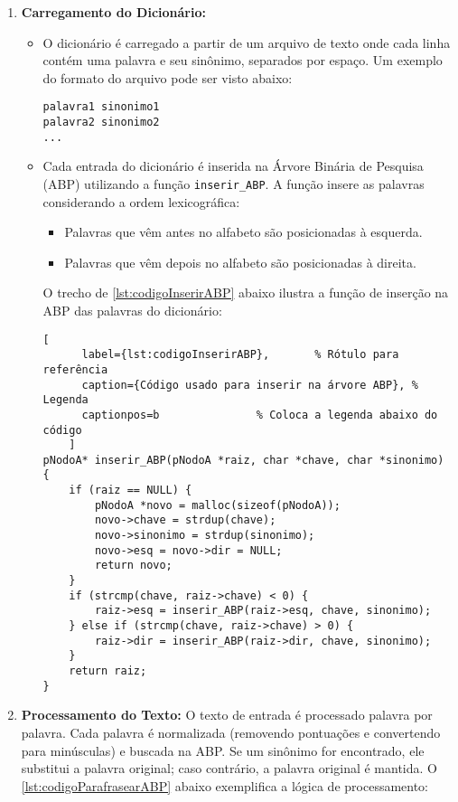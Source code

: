 \documentclass[a4paper, 12pt, english]{article}
\begin{document}
\begin{enumerate}
    \item \textbf{Carregamento do Dicionário:}
    \begin{itemize}
        \item O dicionário é carregado a partir de um arquivo de texto onde cada linha contém uma palavra e seu sinônimo, separados por espaço. Um exemplo do formato do arquivo pode ser visto abaixo:
        \begin{verbatim}
palavra1 sinonimo1
palavra2 sinonimo2
...
        \end{verbatim}
        \item Cada entrada do dicionário é inserida na Árvore Binária de Pesquisa (ABP) utilizando a função \texttt{inserir\_ABP}. A função insere as palavras considerando a ordem lexicográfica:
        \begin{itemize}
            \item Palavras que vêm antes no alfabeto são posicionadas à esquerda.
            \item Palavras que vêm depois no alfabeto são posicionadas à direita.
        \end{itemize}

\newpage

    O trecho de \autoref{lst:codigoInserirABP} abaixo ilustra a função de inserção na ABP das palavras do dicionário:
    \begin{lstlisting}[
      label={lst:codigoInserirABP},       % Rótulo para referência
      caption={Código usado para inserir na árvore ABP}, % Legenda
      captionpos=b               % Coloca a legenda abaixo do código
    ]
pNodoA* inserir_ABP(pNodoA *raiz, char *chave, char *sinonimo) {
    if (raiz == NULL) {
        pNodoA *novo = malloc(sizeof(pNodoA));
        novo->chave = strdup(chave);
        novo->sinonimo = strdup(sinonimo);
        novo->esq = novo->dir = NULL;
        return novo;
    }
    if (strcmp(chave, raiz->chave) < 0) {
        raiz->esq = inserir_ABP(raiz->esq, chave, sinonimo);
    } else if (strcmp(chave, raiz->chave) > 0) {
        raiz->dir = inserir_ABP(raiz->dir, chave, sinonimo);
    }
    return raiz;
}

    \end{lstlisting}
    
    \end{itemize}

    \item \textbf{Processamento do Texto:}
    O texto de entrada é processado palavra por palavra. Cada palavra é normalizada (removendo pontuações e convertendo para minúsculas) e buscada na ABP. Se um sinônimo for encontrado, ele substitui a palavra original; caso contrário, a palavra original é mantida. O \autoref{lst:codigoParafrasearABP} abaixo exemplifica a lógica de processamento:


\end{enumerate}
\end{document}

